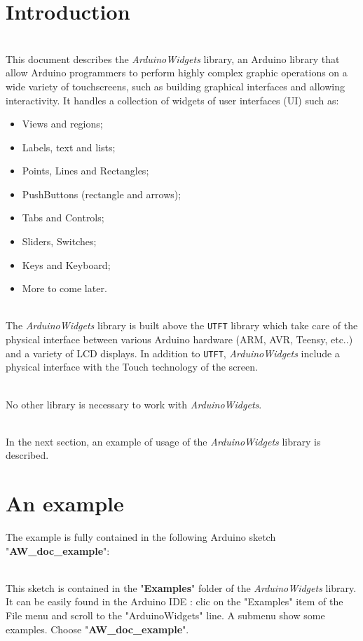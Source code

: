 \documentclass[a4paper,11pt]{extarticle}
\begin{document}
\newpage
\section{Introduction}

~\\This document describes the \emph{ArduinoWidgets} library, an Arduino library that allow Arduino programmers to perform highly complex graphic operations on a wide variety of  touchscreens, such as building graphical interfaces and allowing interactivity. It handles a collection of widgets of user interfaces (UI) such as:

\begin{itemize}
  \item Views and regions;
  \item Labels, text and lists;
  \item Points, Lines and Rectangles;
  \item PushButtons (rectangle and arrows);
  \item Tabs and Controls;
  \item Sliders, Switches;
  \item Keys and Keyboard;
  \item More to come later. 
\end{itemize}

~\\The \emph{ArduinoWidgets} library is built above the \texttt{UTFT} library which take care of the physical interface between various Arduino hardware (ARM, AVR, Teensy, etc..) and a variety of  LCD displays. In addition to \texttt{UTFT}, \emph{ArduinoWidgets} include a physical interface with the Touch technology of the screen.

~\\No other library is necessary to work with \emph{ArduinoWidgets}.

~\\In the next section, an example of usage of the \emph{ArduinoWidgets} library is described.

\newpage
\section{An example}

The example is fully contained in the following Arduino sketch "\textbf{AW\_doc\_example}":

~\\This sketch is contained in the "\textbf{Examples}" folder of the \emph{ArduinoWidgets} library. It can be easily found in the Arduino IDE : clic on the "Examples" item of the File menu and scroll to the "ArduinoWidgets" line. A submenu show some examples. Choose "\textbf{AW\_doc\_example}".
\end{document}
